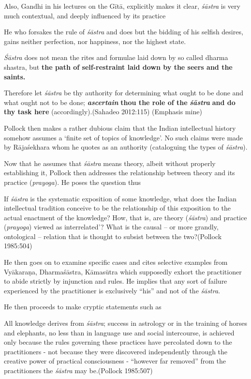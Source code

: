 Also, Gandhi in his lectures on the Gītā, explicitly makes it clear, {\sl śāstra} is very much contextual, and deeply influenced by its practice
\begin{myquote}
He who forsakes the rule of {\sl śāstra} and does but the bidding of his selfish desires, gains neither perfection, nor happiness, nor the highest state.

{\sl Śāstra} does not mean the rites and formulae laid down by so called dharma shastra, but {\bf the path of self-restraint laid down by the seers and the saints.}

Therefore let {\sl śāstra} be thy authority for determining what ought to be done and what ought not to be done; {{\sl\bfseries ascertain}\relax} {\bf thou the role of the} {{\sl\bfseries śāstra}\relax} {\bf and do thy task here} (accordingly).\hfill (Sahadeo 2012:115) (Emphasis mine)
\end{myquote}

Pollock then makes a rather dubious claim that the Indian intellectual history somehow assumes a `finite set of topics of knowledge'. No such claims were made by Rājaśekhara whom he quotes as an authority (cataloguing the types of {\sl śāstra}).

Now that he assumes that {\sl śāstra} means theory, albeit without properly establishing it, Pollock then addresses the relationship between theory and its practice ({\sl prayoga}). He poses the question thus 
\begin{myquote}
If {\sl śāstra} is the systematic exposition of some knowledge, what does the Indian intellectual tradition conceive to be the relationship of this exposition to the actual enactment of the knowledge? How, that is, are theory ({\sl śāstra}) and practice ({\sl prayoga}) viewed as interrelated'? What is the causal -- or more grandly, ontological -- relation that is thought to subsist between the two?\hfill (Pollock 1985:504)
\end{myquote}

He then goes on to examine specific cases and cites selective examples from Vyākaraṇa, Dharmaśāstra, Kāmasūtra which supposedly exhort the practitioner to abide strictly by injunction and rules. He implies that any sort of failure experienced by the practitioner is exclusively ``his'' and not of the {\sl śāstra}.

He then proceeds to make cryptic statements such as 
\begin{myquote}
All knowledge derives from {\sl śāstra}; success in astrology or in the training of horses and elephants, no less than in language use and social intercourse, is achieved only because the rules governing these practices have percolated down to the practitioners - not because they were discovered independently through the creative power of practical consciousness - ``however far removed'' from the practitioners the {\sl śāstra} may be.\hfill (Pollock 1985:507)
\end{myquote}

